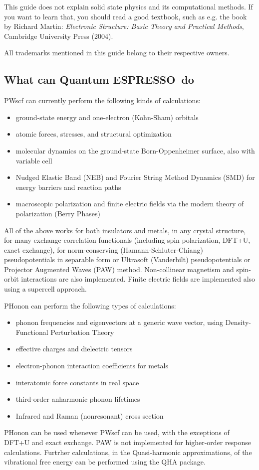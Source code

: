\documentclass[12pt,a4paper]{article}
\def\qe{{\sc Quantum ESPRESSO}}
\begin{document}
This guide does not explain solid state physics and its computational methods.
If you want to learn that, you should read a good textbook, such as e.g.
the book by Richard Martin:
{\em Electronic Structure: Basic Theory and Practical Methods},
Cambridge University Press (2004).

All trademarks mentioned in this guide belong to their respective owners.

\subsection{What can \qe\ do}

PWscf can currently perform the following kinds of calculations:
\begin{itemize}
  \item ground-state energy and one-electron (Kohn-Sham) orbitals
  \item atomic forces, stresses, and structural optimization
  \item molecular dynamics on the ground-state Born-Oppenheimer surface, 
   also with variable cell
  \item Nudged Elastic Band (NEB) and Fourier String Method Dynamics (SMD)
  for energy barriers and reaction paths
  \item macroscopic polarization and finite electric fields via 
  the modern theory of polarization (Berry Phases)
\end{itemize}
All of the above works for both insulators and metals, 
in any crystal structure, for many exchange-correlation functionals
(including spin polarization, DFT+U, exact exchange), for
norm-conserving (Hamann-Schluter-Chiang) pseudopotentials in 
separable form or Ultrasoft (Vanderbilt) pseudopotentials 
or Projector Augmented Waves (PAW) method.
Non-collinear magnetism and spin-orbit interactions 
are also implemented.  
Finite electric fields are implemented also using a supercell approach.

PHonon can perform the following types of calculations:
\begin{itemize}
  \item phonon frequencies and eigenvectors at a generic wave vector,
  using Density-Functional Perturbation Theory
  \item effective charges and dielectric tensors
  \item electron-phonon interaction coefficients for metals
  \item interatomic force constants in real space
  \item third-order anharmonic phonon lifetimes
  \item Infrared and Raman (nonresonant) cross section
\end{itemize}
PHonon can be used whenever PWscf can be used, with the exceptions of
DFT+U and exact exchange. PAW is not implemented for higher-order 
response calculations. Furtrher calculations, in the Quasi-harmonic 
approximations, of the vibrational free energy can be performed
using the QHA  package.
\end{document}

